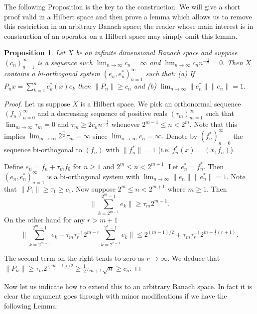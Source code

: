\documentclass[12pt]{amsart}
\newtheorem{prop}[thm]{Proposition}
\begin{document}
The following Proposition is the key to the construction.  We will
give a short proof valid in a Hilbert space and then prove a lemma
which allows us to remove this restriction in an arbitrary Banach
space; the reader whose main interest is in construction of an
operator on a Hilbert space may  simply omit this lemma.




\begin{prop}\label{refine} Let $X$ be an infinite dimensional
Banach space and suppose $(c_n)_{n=1}^{\infty}$ is a sequence such
$\lim_{n\to\infty}c_n=\infty$ and
$\lim_{n\to\infty}c_nn^{-\frac12}=0.$ Then $X$ contains a
bi-orthogonal system $(e_n,e_n^*)_{n=1}^{\infty}$ such that:
\newline
(a) If $P_nx=\sum_{k=1}^n e_k^*(x)e_k$ then $\|P_n\|\ge c_n$ and
\newline
(b) $\lim_{n\to\infty}\|e_n^*\|\|e_n\|=1.$
\end{prop}

\begin{proof}  Let us suppose $X$ is a Hilbert space.  We pick an
orthonormal sequence $(f_n)_{n=0}^{\infty}$ and a decreasing
sequence of positive reals $(\tau_m)_{m=1}^{\infty}$ such that
$\lim_{m\to\infty}\tau_m=0$ and $\tau_m\ge 2c_nn^{-\frac12}$
whenever $2^{m-1}\le n<2^{m}$.  Note that this implies
$\lim_{m\to\infty}2^{\frac{m}2}\tau_m=\infty$ since
$\lim_{n\to\infty}c_n=\infty.$ Denote by $(f_n^*)_{n=0}^{\infty}$
the sequence bi-orthogonal to $(f_n)$ with $\|f_n^*\|=1$ (i.e.
$f_n^*(x)=(x,f_n)$).

Define $e_n=f_n+\tau_m f_0$ for $n\ge 1$ and $2^m\le n<2^{m+1}.$
Let $e_n^*=f_n^*.$  Then $(e_n,e_n^*)_{n=1}^{\infty}$ is a
bi-orthogonal system with $\lim _{n\to\infty}\|e_n\|\|e_n^*\|=1.$
Note that $\|P_1\|\ge \tau_1\ge c_1.$  Now suppose $2^m\le
n<2^{m+1}$ where $m\ge 1.$  Then
$$ \|\sum_{k=2^{m-1}}^{2^m-1}e_k\| \ge  \tau_{m} 2^{m-1}.$$
On the other hand for any $r>m+1$
$$ \| \sum_{k=2^{m-1}}^{2^m-1}e_k -
\tau_{m}\tau_{r}^{-1}2^{m-r}\sum_{k=2^{r-1}}^{2^r-1}e_k\| \le
2^{(m-1)/2} + \tau_m\tau_r^{-1}2^{m-\frac12(r+1)}.$$

The second term on the right tends to zero as $r\to\infty.$  We
deduce that $\|P_n\| \ge \tau_m 2^{(m-1)/2}\ge \frac12\tau_{m+1}
\sqrt{n}\ge c_n.$  \end{proof}

Now let us indicate how to extend this to an arbitrary Banach
space.  In fact it is clear the argument goes through with minor
modifications if we have the following Lemma:
\end{document}
